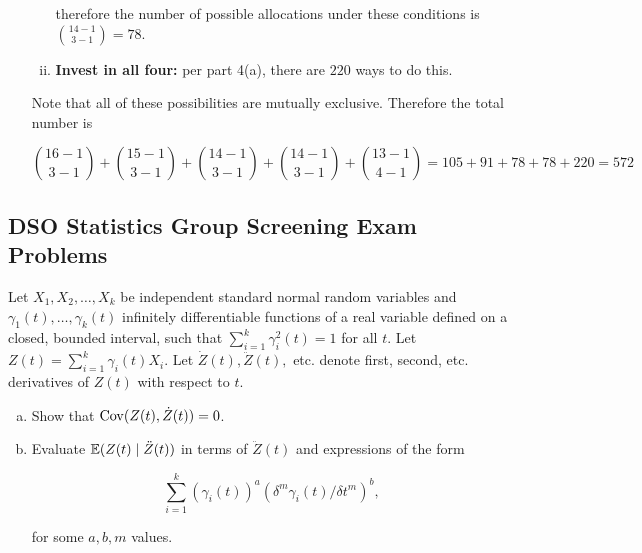 \begin{enumerate}[(a)]
\begin{enumerate}[(i)]
therefore the number of possible allocations under these conditions is \(\binom{14 - 1}{3 - 1} = \boxed{78} \).

\item \textbf{Invest in all four:} per part 4(a), there are \(\boxed{220}\) ways to do this.

\end{enumerate}

Note that all of these possibilities are mutually exclusive. Therefore the total number is 

\[
\binom{16 - 1}{3 - 1} + \binom{15 - 1}{3 - 1} + \binom{14 - 1}{3 - 1} + \binom{14 - 1}{3 - 1} + \binom{13 - 1}{4 - 1} = 105 + 91 + 78 + 78 + 220 = \boxed{572}
\]

\end{enumerate}

\subsection{DSO Statistics Group Screening Exam Problems}

\begin{exercise}

Let \(X_1, X_2, \ldots, X_k\) be independent standard normal random variables and \(\gamma_1(t), \ldots, \gamma_k(t)\) infinitely differentiable functions of a real variable defined on a closed, bounded interval, such that \(\sum_{i=1}^k \gamma_i^2(t) = 1\) for all \(t\). Let \(Z(t) = \sum_{i=1}^k \gamma_i(t) X_i\). Let \(\dot{Z}(t), \ddot{Z}(t),\) etc. denote first, second, etc. derivatives of \(Z(t)\) with respect to \(t\).

\begin{enumerate}[(a)]

\item Show that \(\mathrm{Cov}(Z(t), \dot{Z}(t) ) =0\).

\item Evaluate \(\mathbb{E}(Z(t) \mid \ddot{Z}(t))\) in terms of \(\ddot{Z}(t)\) and expressions of the form

\[
\sum_{i=1}^k (\gamma_i(t))^a (\delta^m \gamma_i(t)/ \delta t^m)^b,
\]

for some \(a, b, m\) values.

\end{enumerate}

\end{exercise}

